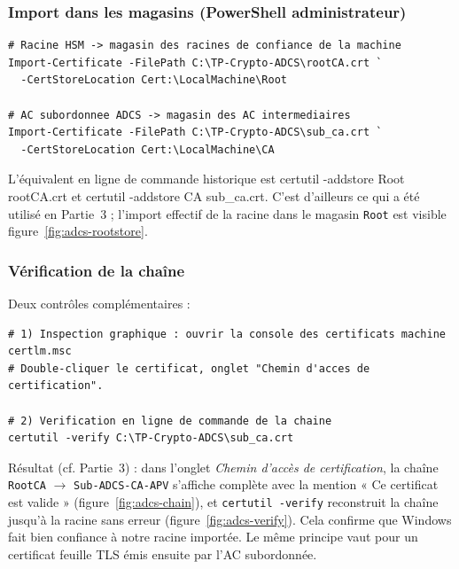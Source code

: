 \documentclass[11pt,a4paper]{article}
\newcommand{\cmdinline}[1]{\colorbox{outbg}{\ttfamily\small #1}}
\begin{document}
\subsubsection{Import dans les magasins (PowerShell administrateur)}
\begin{lstlisting}[style=cmd]
# Racine HSM -> magasin des racines de confiance de la machine
Import-Certificate -FilePath C:\TP-Crypto-ADCS\rootCA.crt `
  -CertStoreLocation Cert:\LocalMachine\Root

# AC subordonnee ADCS -> magasin des AC intermediaires
Import-Certificate -FilePath C:\TP-Crypto-ADCS\sub_ca.crt `
  -CertStoreLocation Cert:\LocalMachine\CA
\end{lstlisting}

\begin{notebox}
L'équivalent en ligne de commande historique est \cmdinline{certutil -addstore Root
rootCA.crt} et \cmdinline{certutil -addstore CA sub\_ca.crt}. C'est d'ailleurs ce qui a été
utilisé en Partie~3 ; l'import effectif de la racine dans le magasin \texttt{Root} est
visible figure~\ref{fig:adcs-rootstore}.
\end{notebox}

\subsubsection{Vérification de la chaîne}
Deux contrôles complémentaires :
\begin{lstlisting}[style=cmd]
# 1) Inspection graphique : ouvrir la console des certificats machine
certlm.msc
# Double-cliquer le certificat, onglet "Chemin d'acces de certification".

# 2) Verification en ligne de commande de la chaine
certutil -verify C:\TP-Crypto-ADCS\sub_ca.crt
\end{lstlisting}
\begin{reponse}
Résultat (cf. Partie~3) : dans l'onglet \emph{Chemin d'accès de certification}, la chaîne
\texttt{RootCA} $\rightarrow$ \texttt{Sub-ADCS-CA-APV} s'affiche complète avec la mention
« Ce certificat est valide » (figure~\ref{fig:adcs-chain}), et \texttt{certutil -verify}
reconstruit la chaîne jusqu'à la racine sans erreur (figure~\ref{fig:adcs-verify}). Cela
confirme que Windows fait bien confiance à notre racine importée. Le même principe vaut
pour un certificat feuille TLS émis ensuite par l'AC subordonnée.
\end{reponse}

\newpage
\end{document}
